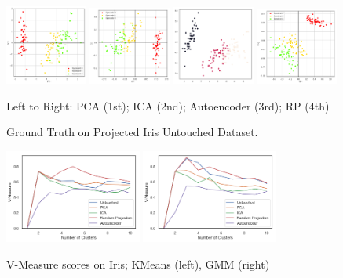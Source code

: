 \documentclass[letter]{article}
\begin{document}
\begin{figure}
  \centering
  \includegraphics[width=0.24\textwidth]{images/groundTruthIris.png}
  \includegraphics[width=0.24\textwidth]{images/groundTruthICA.png}
  \includegraphics[width=0.24\textwidth]{images/groundTruthAutoencoder.png}
  \includegraphics[width=0.24\textwidth]{images/groundTruthRP.png}
  \caption{Ground Truth on Projected Iris Untouched Dataset.}
  Left to Right: PCA (1st); ICA (2nd); Autoencoder (3rd); RP (4th)
\end{figure}

\begin{figure}
  \centering
  \includegraphics[width=0.4\textwidth]{images/irisKmeansVmeasure.png}
  \includegraphics[width=0.4\textwidth]{images/irisGmmVmeasure.png}
  \caption{V-Measure scores on Iris; KMeans (left), GMM (right)}
\end{figure}
\end{document}
